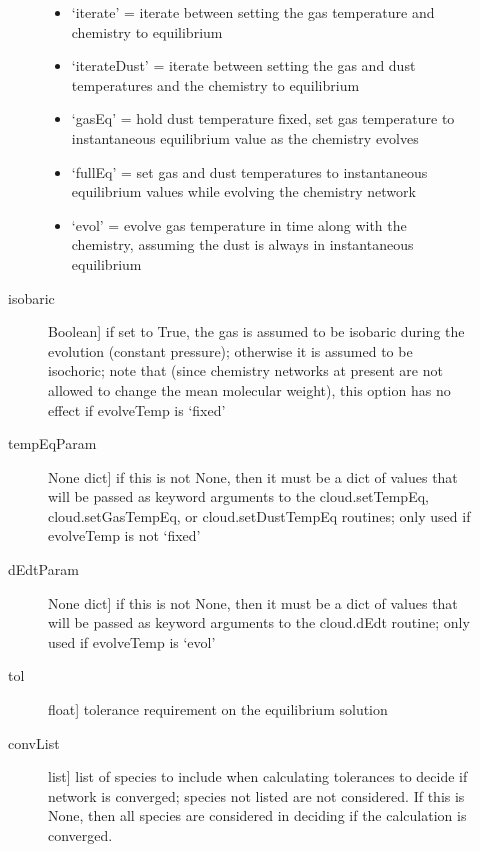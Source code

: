 \documentclass[letterpaper,10pt,english]{sphinxmanual}
\begin{document}
\begin{fulllineitems}
\begin{description}
\begin{description}
\begin{itemize}
\item {} 
`iterate' = iterate between setting the gas temperature and
chemistry to equilibrium

\item {} 
`iterateDust' = iterate between setting the gas and dust
temperatures and the chemistry to equilibrium

\item {} 
`gasEq' = hold dust temperature fixed, set gas temperature to
instantaneous equilibrium value as the chemistry evolves

\item {} 
`fullEq' = set gas and dust temperatures to instantaneous
equilibrium values while evolving the chemistry network

\item {} 
`evol' = evolve gas temperature in time along with the
chemistry, assuming the dust is always in instantaneous
equilibrium

\end{itemize}

\item[{isobaric}] \leavevmode{[}Boolean{]}
if set to True, the gas is assumed to be isobaric during the
evolution (constant pressure); otherwise it is assumed to be
isochoric; note that (since chemistry networks at present are
not allowed to change the mean molecular weight), this option
has no effect if evolveTemp is `fixed'

\item[{tempEqParam}] \leavevmode{[}None \textbar{} dict{]}
if this is not None, then it must be a dict of values that
will be passed as keyword arguments to the cloud.setTempEq,
cloud.setGasTempEq, or cloud.setDustTempEq routines; only used
if evolveTemp is not `fixed'

\item[{dEdtParam}] \leavevmode{[}None \textbar{} dict{]}
if this is not None, then it must be a dict of values that
will be passed as keyword arguments to the cloud.dEdt
routine; only used if evolveTemp is `evol'

\item[{tol}] \leavevmode{[}float{]}
tolerance requirement on the equilibrium solution

\item[{convList}] \leavevmode{[}list{]}
list of species to include when calculating tolerances to
decide if network is converged; species not listed are not
considered. If this is None, then all species are considered
in deciding if the calculation is converged.


\end{description}
\end{description}
\end{fulllineitems}
\end{document}

